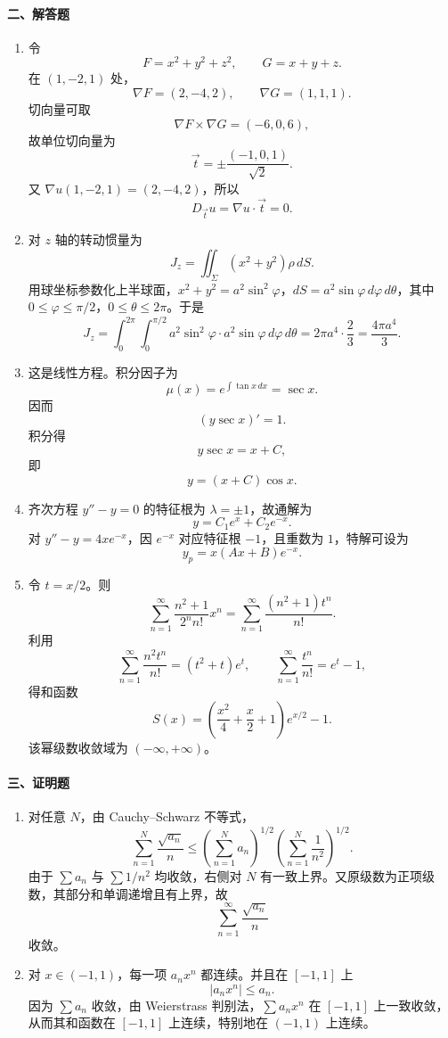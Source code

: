\paragraph*{二、解答题}
\begin{enumerate}
  \item 令
  \[
    F=x^2+y^2+z^2,\qquad G=x+y+z.
  \]
  在 $(1,-2,1)$ 处，
  \[
    \nabla F=(2,-4,2),\qquad \nabla G=(1,1,1).
  \]
  切向量可取
  \[
    \nabla F\times\nabla G=(-6,0,6),
  \]
  故单位切向量为
  \[
    \vec t=\pm\frac{(-1,0,1)}{\sqrt2}.
  \]
  又 $\nabla u(1,-2,1)=(2,-4,2)$，所以
  \[
    D_{\vec t}u=\nabla u\cdot\vec t=0.
  \]
  \item 对 $z$ 轴的转动惯量为
  \[
    J_z=\iint_\Sigma (x^2+y^2)\rho\,dS.
  \]
  用球坐标参数化上半球面，$x^2+y^2=a^2\sin^2\varphi$，$dS=a^2\sin\varphi\,d\varphi\,d\theta$，其中 $0\le\varphi\le\pi/2$，$0\le\theta\le2\pi$。于是
  \[
    J_z=\int_0^{2\pi}\int_0^{\pi/2}a^2\sin^2\varphi\cdot a^2\sin\varphi\,d\varphi\,d\theta
    =2\pi a^4\cdot\frac23
    =\frac{4\pi a^4}{3}.
  \]
  \item 这是线性方程。积分因子为
  \[
    \mu(x)=e^{\int\tan x\,dx}=\sec x.
  \]
  因而
  \[
    (y\sec x)'=1.
  \]
  积分得
  \[
    y\sec x=x+C,
  \]
  即
  \[
    y=(x+C)\cos x.
  \]
  \item 齐次方程 $y''-y=0$ 的特征根为 $\lambda=\pm1$，故通解为
  \[
    y=C_1e^x+C_2e^{-x}.
  \]
  对 $y''-y=4xe^{-x}$，因 $e^{-x}$ 对应特征根 $-1$，且重数为 $1$，特解可设为
  \[
    y_p=x(Ax+B)e^{-x}.
  \]
  \item 令 $t=x/2$。则
  \[
    \sum_{n=1}^{\infty}\frac{n^2+1}{2^n n!}x^n
    =\sum_{n=1}^{\infty}\frac{(n^2+1)t^n}{n!}.
  \]
  利用
  \[
    \sum_{n=1}^{\infty}\frac{n^2t^n}{n!}=(t^2+t)e^t,\qquad
    \sum_{n=1}^{\infty}\frac{t^n}{n!}=e^t-1,
  \]
  得和函数
  \[
    S(x)=\left(\frac{x^2}{4}+\frac{x}{2}+1\right)e^{x/2}-1.
  \]
  该幂级数收敛域为 $(-\infty,+\infty)$。
\end{enumerate}

\paragraph*{三、证明题}
\begin{enumerate}
  \item 对任意 $N$，由 Cauchy--Schwarz 不等式，
  \[
    \sum_{n=1}^{N}\frac{\sqrt{a_n}}{n}
    \le
    \left(\sum_{n=1}^{N}a_n\right)^{1/2}
    \left(\sum_{n=1}^{N}\frac1{n^2}\right)^{1/2}.
  \]
  由于 $\sum a_n$ 与 $\sum 1/n^2$ 均收敛，右侧对 $N$ 有一致上界。又原级数为正项级数，其部分和单调递增且有上界，故
  \[
    \sum_{n=1}^{\infty}\frac{\sqrt{a_n}}{n}
  \]
  收敛。
  \item 对 $x\in(-1,1)$，每一项 $a_nx^n$ 都连续。并且在 $[-1,1]$ 上
  \[
    |a_nx^n|\le a_n.
  \]
  因为 $\sum a_n$ 收敛，由 Weierstrass 判别法，$\sum a_nx^n$ 在 $[-1,1]$ 上一致收敛，从而其和函数在 $[-1,1]$ 上连续，特别地在 $(-1,1)$ 上连续。
\end{enumerate}

